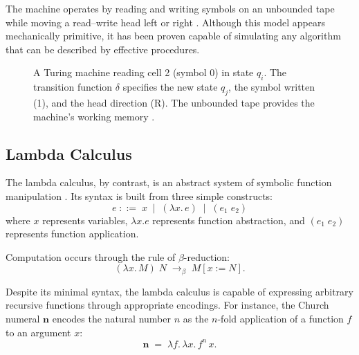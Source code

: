 \documentclass[11pt]{article}
\theoremstyle{definition}
\begin{document}
The machine operates by reading and writing symbols on an unbounded tape
while moving a read--write head left or right \cite{turing1936}. Although
this model appears mechanically primitive, it has been proven capable of
simulating any algorithm that can be described by effective procedures.

\begin{figure}[h]
\centering
{}
\caption{A Turing machine reading cell 2 (symbol 0) in state $q_i$.
The transition function $\delta$ specifies the new state $q_j$, the
symbol written (1), and the head direction (R). The unbounded tape
provides the machine's working memory \cite{turing1936}.}
\label{fig:turing}
\end{figure}

\subsection{Lambda Calculus}

The lambda calculus, by contrast, is an abstract system of symbolic
function manipulation \cite{church1936}. Its syntax is built from three
simple constructs:
\[
e \;::=\; x \;\mid\; (\lambda x.\, e) \;\mid\; (e_1 \; e_2)
\]
where $x$ represents variables, $\lambda x.e$ represents function
abstraction, and $(e_1 \; e_2)$ represents function application.

Computation occurs through the rule of $\beta$-reduction:
\[
(\lambda x.\, M)\; N \;\longrightarrow_\beta\; M[x := N].
\]

Despite its minimal syntax, the lambda calculus is capable of expressing
arbitrary recursive functions through appropriate encodings. For
instance, the Church numeral $\mathbf{n}$ encodes the natural number
$n$ as the $n$-fold application of a function $f$ to an argument $x$:
\[
\mathbf{n} \;=\; \lambda f.\, \lambda x.\, f^n\, x.
\]
\end{document}
